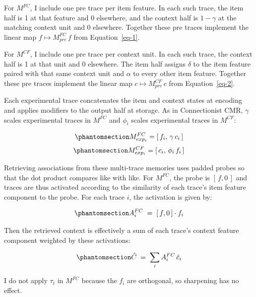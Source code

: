 \documentclass[
  letterpaper,
  11pt,
  english,
  singlespacing,
  headsepline]{MastersDoctoralThesis}
\begin{document}
For \(M^{FC}\), I include one pre trace per item feature. In each such
trace, the item half is 1 at that feature and 0 elsewhere, and the
context half is \(1-\gamma\) at the matching context unit and 0
elsewhere. Together these pre traces implement the linear map
\(f \mapsto M^{FC}_{pre}\, f\) from Equation~\ref{eq-1}.

For \(M^{CF}\), I include one pre trace per context unit. In each such
trace, the context half is 1 at that unit and 0 elsewhere. The item half
assigns \(\delta\) to the item feature paired with that same context
unit and \(\alpha\) to every other item feature. Together these pre
traces implement the linear map \(c \mapsto M^{CF}_{pre}\, c\) from
Equation~\ref{eq-2}.

Each experimental trace concatenates the item and context states at
encoding and applies modifiers to the output half at storage. As in
Connectionist CMR, \(\gamma\) scales experimental traces in \(M^{FC}\)
and \(\phi_i\) scales experimental traces in \(M^{CF}\):

\begin{equation}\phantomsection\label{eq-8}{
M^{FC}_{exp_i} = [\,f_i,\, \gamma\, c_i\,]
}\end{equation} \begin{equation}\phantomsection\label{eq-9}{
M^{CF}_{exp_i} = [\,c_i,\, \phi_i\, f_i\,]
}\end{equation}

Retrieving associations from these multi-trace memories uses padded
probes so that the dot product compares like with like. For \(M^{FC}\),
the probe is \([\,f, 0\,]\) and traces are thus activated according to
the similarity of each trace's item feature component to the probe. For
each trace \(i\), the activation is given by:

\begin{equation}\phantomsection\label{eq-10}{
A^{FC}_i \;=\; [\,f,0\,]\cdot f_i
}\end{equation}

Then the retrieved context is effectively a sum of each trace's context
feature component weighted by these activations:

\begin{equation}\phantomsection\label{eq-11}{
\hat C \;=\; \sum_i A^{FC}_i\, \tilde c_i
}\end{equation}

I do not apply \(\tau_t\) in \(M^{FC}\) because the \(f_i\) are
orthogonal, so sharpening has no effect.
\end{document}
